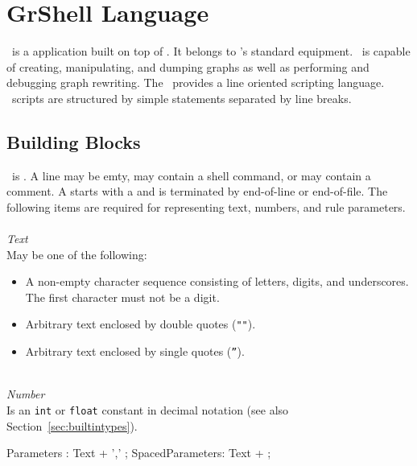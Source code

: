 \chapter{GrShell Language}
\label{chapgrshell}
\GrShell\ is a  application built on top of \LibGr{}. 
It belongs to \GrG's standard equipment. 
\GrShell\ is capable of creating, manipulating, and dumping graphs as well as performing and debugging graph rewriting.
The \GrShell\ provides a line oriented scripting language. 
\GrShell\ scripts are structured by simple statements separated by line breaks.


\section{Building Blocks}

\GrShell\ is . 
A line may be emty, may contain a shell command, or may contain a comment. 
A  starts with a \indexed{\texttt{\#}} and is terminated by end-of-line or end-of-file. 
The following items are required for representing text, numbers, and rule parameters.\\
\\
\emph{Text}\\
May be one of the following:
\begin{itemize}
  \item A non-empty character sequence consisting of letters, digits, and underscores. The first character must not be a digit.
  \item Arbitrary text enclosed by double quotes (\texttt{""}).
  \item Arbitrary text enclosed by single quotes (\texttt{''}).
\end{itemize}
\mbox{ }\\
\emph{Number}\\
Is an \texttt{int} or \texttt{float} constant in decimal notation (see also Section~\ref{sec:builtintypes}).

\begin{rail} 
 Parameters : Text + ',' ;
 SpacedParameters: Text + ; 
\end{rail}

